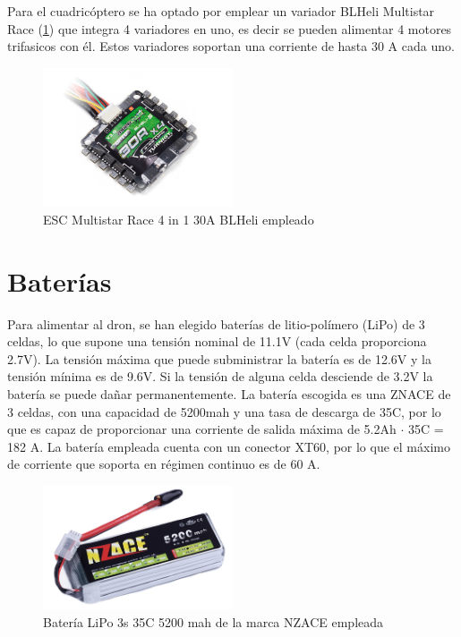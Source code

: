Para el cuadricóptero se ha optado por emplear un variador BLHeli Multistar Race (\cref{hardware:esc}) que integra 4 variadores en uno, es decir se pueden alimentar 4 motores trifasicos con él. Estos variadores soportan una corriente de hasta 30 A cada uno.

\begin{figure}[htb!]
	\centering
	\includegraphics[width=0.5\textwidth]{hardware/esc.jpg}
	\caption{ESC Multistar Race 4 in 1 30A BLHeli empleado}
	\label{hardware:esc}
\end{figure}

\section{Baterías}
Para alimentar al dron, se han elegido baterías de litio-polímero (LiPo) de 3 celdas, lo que supone una tensión nominal de 11.1V (cada celda proporciona 2.7V). La tensión máxima que puede subministrar la batería es de 12.6V y la tensión mínima es de 9.6V. Si la tensión de alguna celda desciende de 3.2V la batería se puede dañar permanentemente. La batería escogida es una ZNACE de 3 celdas, con una capacidad de 5200mah y una tasa de descarga de 35C, por lo que es capaz de proporcionar una corriente de salida máxima de 5.2Ah $\cdot$ 35C = 182 A. La batería empleada cuenta con un conector XT60, por lo que el máximo de corriente que soporta en régimen continuo es de 60 A.

\begin{figure}[htb!]
		\centering
		\includegraphics[width=0.5\textwidth]{hardware/bateriaNZACE}
		\caption{Batería LiPo 3s 35C 5200 mah de la marca NZACE empleada  }
		\label{hardware:Lipo}

\end{figure}


